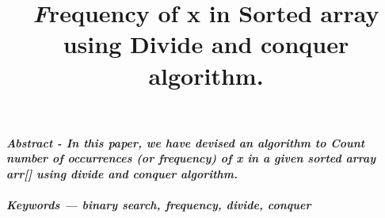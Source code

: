 \documentclass[conference]{IEEEtran}
\begin{document}
\title{\emph \textbf Frequency of x in Sorted array using Divide and
conquer algorithm.\\

 
}

\author{
\and
{}
\and
{}


}

\maketitle
\textbf{\emph{Abstract - In this paper, we have devised an algorithm to Count number of occurrences (or frequency) of x in a given sorted array arr[] using divide and conquer algorithm.\\ \\
Keywords — binary search, frequency, divide, conquer}}\\
\end{document}

